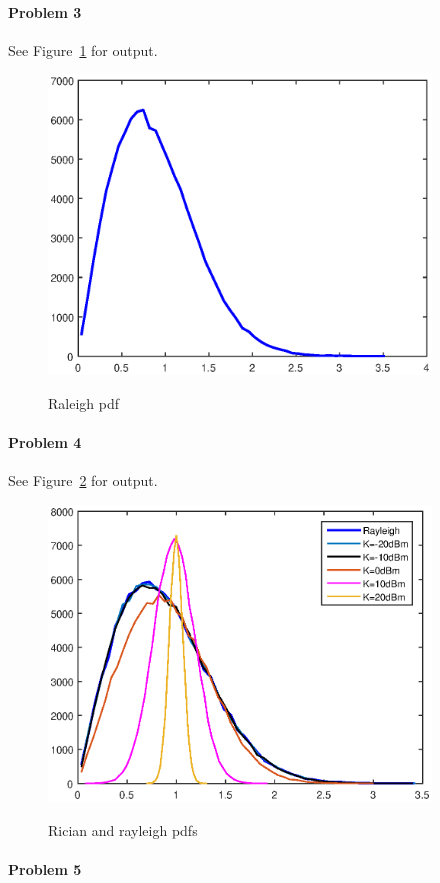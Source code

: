 \documentclass[12pt]{article}
\begin{document}
\paragraph{Problem 3}

See Figure~\ref{fig:ray} for output.
\begin{figure}
  \centering
  \includegraphics[width=4.0in]{ray.eps}\\
  \caption{Raleigh pdf}\label{fig:ray}
\end{figure}

\paragraph{Problem 4}

See Figure~\ref{fig:ric} for output.
\begin{figure}
    \centering
  \includegraphics[width=4.0in]{ric.eps}\\
  \caption{Rician and rayleigh pdfs}\label{fig:ric}
\end{figure}
\paragraph{Problem 5}

\end{document}
